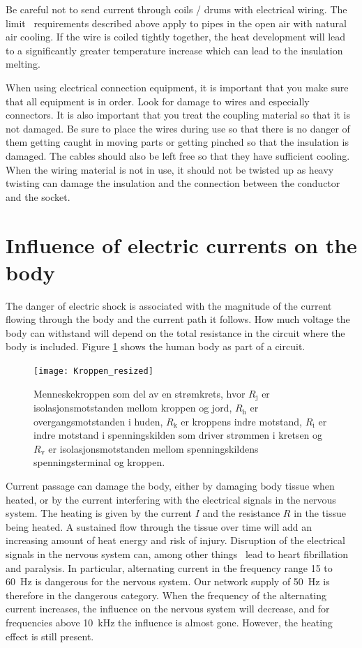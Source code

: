\documentclass[../Elmag-labhefte-2020.tex]{subfiles}
\begin{document}
Be careful not to send current through coils / drums with electrical wiring. The limit \ requirements described above apply to pipes in the open air with natural air cooling. If the wire is coiled tightly together, the heat development will lead to a significantly greater temperature increase which can lead to the insulation melting.

When using electrical connection equipment, it is important that you make sure that all equipment is in order. Look for damage to wires and especially connectors. It is also important that you treat the coupling material so that it is not damaged. Be sure to place the wires during use so that there is no danger of them getting caught in moving parts or getting pinched so that the insulation is damaged. The cables should also be left free so that they have sufficient cooling. When the wiring material is not in use, it should not be twisted up as heavy twisting can damage the insulation and the connection between the conductor and the socket.


\section{Influence of electric currents on the body}

The danger of electric shock is associated with the magnitude of the current flowing through the body and the current path it follows. How much voltage the body can withstand will depend on the total resistance in the circuit where the body is included. Figure \ref{fig:Kroppen} shows the human body as part of a circuit.


\begin{figure}[htbp] 
    \centering
    \texttt{[image: Kroppen\_resized]}
    \caption{
    Menneskekroppen som del av en strømkrets, hvor $R_\text{j}$ er isolasjonsmotstanden mellom kroppen og jord, $R_\text{h}$ er overgangsmotstanden i huden, $R_\text{k}$ er kroppens indre motstand, $R_\text{i}$ er indre motstand i spenningskilden som driver strømmen i kretsen og $R_\text{v}$ er isolasjonsmotstanden mellom spenningskildens spenningsterminal og kroppen.
    }
    \label{fig:Kroppen}
\end{figure}

Current passage can damage the body, either by damaging body tissue when heated, or by the current interfering with the electrical signals in the nervous system. The heating is given by the current $I$ and the resistance $R$ in the tissue being heated. A sustained flow through the tissue over time will add an increasing amount of heat energy and risk of injury. Disruption of the electrical signals in the nervous system can, among other things \, lead to heart fibrillation and paralysis. In particular, alternating current in the frequency range \num{15} to \SI{60}{\hertz} is dangerous for the nervous system. Our network supply of \SI{50}{\hertz} is therefore in the dangerous category. When the frequency of the alternating current increases, the influence on the nervous system will decrease, and for frequencies above \SI{10}{\kilo\hertz} the influence is almost gone. However, the heating effect is still present.
\end{document}
